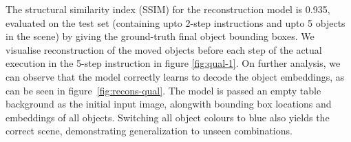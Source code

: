 The structural similarity index (SSIM) \cite{ssim2004} for the reconstruction model is 0.935, evaluated on the test set (containing upto 2-step instructions and upto 5 objects in the scene) by giving the ground-truth final object bounding boxes. We visualise reconstruction of the moved objects before each step of the actual execution in the 5-step instruction in figure \ref{fig:qual-1}. On further analysis, we can observe that the model correctly learns to decode the object embeddings, as can be seen in figure~\ref{fig:recons-qual}. The model is passed an empty table background as the initial input image, alongwith bounding box locations and embeddings of all objects. Switching all object colours to blue also yields the correct scene, demonstrating generalization to unseen combinations. 


\begin{figure}
    \centering


\end{figure}
